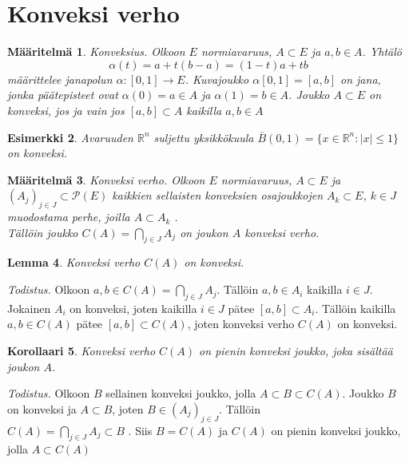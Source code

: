 \documentclass[12pt,a4paper,reqno]{amsart}
\newcommand{\R}{\mathbb{R}}
\newtheorem{maar}{Määritelmä}[section]
\newtheorem{lemma}[maar]{Lemma}
\newtheorem{esim}[maar]{Esimerkki}
\newtheorem{korollaari}[maar]{Korollaari}
\begin{document}
\section{Konveksi verho}
\begin{maar}%
Konveksius. \emph{Olkoon $E$ normiavaruus, $A\subset E$ ja $a,b\in A$. Yhtälö 
$$\alpha (t)=a+t(b-a)=(1-t)a+tb$$ 
määrittelee janapolun $\alpha \colon [0,1]\rightarrow E$. Kuvajoukko $\alpha [0,1] = [a,b]$ on jana, jonka päätepisteet ovat $\alpha (0)=a\in A$ ja $\alpha (1)=b\in A$. 
Joukko $A\subset E$ on konveksi, jos ja vain jos $[a,b]\subset A$ kaikilla $a,b\in A$ 
}
\end{maar}
\begin{esim}
\emph{
Avaruuden $\R ^n$ suljettu yksikkökuula $ \bar B(0,1)= \{x\in \R ^n \colon |x|\leq 1\}$ on konveksi.
}
\end{esim}
\begin{maar}Konveksi verho. \emph{Olkoon $E$ normiavaruus, $A\subset E$ ja $(A_j)_{j\in J}\subset \mathcal{P}(E)$ 
kaikkien sellaisten konveksien osajoukkojen $A_k\subset E$, $k\in J$ muodostama perhe, joilla %
$A\subset A_k$%
.\\ Tällöin joukko $C(A)=\bigcap_{j\in J} A_j$ on joukon $A$ konveksi verho. }
\end{maar}
\begin{lemma} \emph{Konveksi verho $C(A)$ on konveksi}.\end{lemma} 
\emph{Todistus.} Olkoon $a,b\in C(A)=\bigcap_{j\in J} A_j$. 
Tällöin $a,b\in A_i$ kaikilla $i\in J$. %
Jokainen $A_i$ on konveksi, joten kaikilla $i\in J$ pätee $[a,b]\subset A_i$.
Tällöin kaikilla $a,b\in C(A)$ pätee $[a,b] \subset C(A)$, joten konveksi verho $C(A)$ on konveksi.
\begin{korollaari}\emph{Konveksi verho $C(A)$ on pienin konveksi joukko, joka sisältää joukon $A$.}
\end{korollaari}
\emph{Todistus.} Olkoon $B$ sellainen konveksi joukko, jolla $A\subset B\subset C(A)$. 
Joukko $B$ on konveksi ja $A\subset B$, joten $B\in (A_j)_{j\in J}$. 
Tällöin\\ $C(A)=\bigcap_{j\in J} A_j\subset B$%
. Siis $B= C(A)$ ja $C(A)$ on pienin konveksi joukko, jolla $A\subset C(A)$
\end{document}
